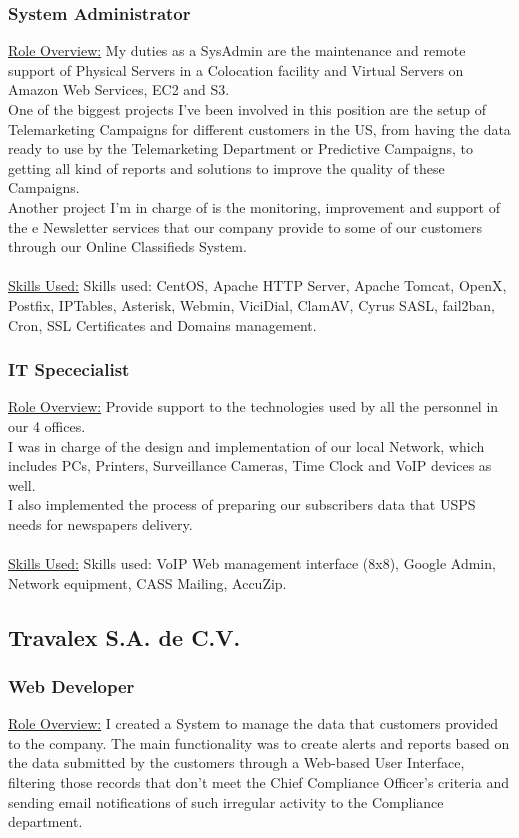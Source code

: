 \documentclass[letterpaper, 11pt]{article}
\begin{document}
	\subsubsection*{System Administrator}
	\underline{Role Overview:} 
	My duties as a SysAdmin are the maintenance and remote support of Physical Servers in a Colocation facility and Virtual Servers on Amazon Web Services, EC2 and S3.\\

One of the biggest projects I've been involved in this position are the setup of Telemarketing Campaigns for different customers in the US, from having the data ready to use by the Telemarketing Department or Predictive Campaigns, to getting all kind of reports and solutions to improve the quality of these Campaigns.\\

Another project I’m in charge of is the monitoring, improvement and support of the e Newsletter services that our company provide to some of our customers through our Online Classifieds System.\\\\
	\underline{Skills Used:}
	Skills used: CentOS, Apache HTTP Server, Apache Tomcat, OpenX, Postfix, IPTables, Asterisk, Webmin, ViciDial, ClamAV, Cyrus SASL, fail2ban, Cron, SSL Certificates and Domains management.
	\subsubsection*{IT Spececialist}
	\underline{Role Overview:} 
	Provide support to the technologies used by all the personnel in our 4 offices. \\
I was in charge of the design and implementation of our local Network, which includes PCs, Printers, Surveillance Cameras, Time Clock and VoIP devices as well.\\

I also implemented the process of preparing our subscribers data that USPS needs for newspapers delivery.\\\\
	\underline{Skills Used:}
	Skills used: VoIP Web management interface (8x8), Google Admin, Network equipment, CASS Mailing, AccuZip.
	\subsection*{\LARGE{\textbf{Travalex S.A. de C.V.}}}
	\subsubsection*{Web Developer}
	\underline{Role Overview:} 
	I created a System to manage the data that customers provided to the company. 
The main functionality was to create alerts and reports based on the data submitted by the customers through a Web-based User Interface, filtering those records that don’t meet the Chief Compliance Officer’s criteria and sending email notifications of such irregular activity to the Compliance department.\\
\end{document}
